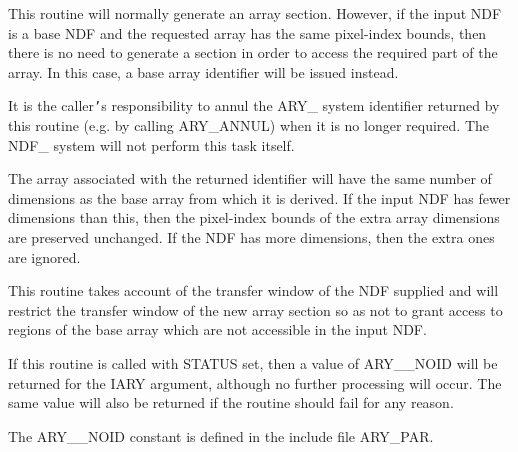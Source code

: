 \documentclass[twoside,11pt,nolof]{starlink}
\providecommand{\hi}[1]{{\texttt{#1}}}
\begin{document}
{{{         \sstitem
         This routine will normally generate an array section. However,
         if the input NDF is a base NDF and the requested array has the
         same pixel-index bounds, then there is no need to generate a
         section in order to access the required part of the array. In
         this case, a base array identifier will be issued instead.

         \sstitem
         It is the caller\hi{'}s responsibility to annul the ARY\_ system
         identifier returned by this routine (e.g. by calling ARY\_ANNUL)
         when it is no longer required. The NDF\_ system will not perform
         this task itself.

         \sstitem
         The array associated with the returned identifier will have
         the same number of dimensions as the base array from which it is
         derived. If the input NDF has fewer dimensions than this, then
         the pixel-index bounds of the extra array dimensions are
         preserved unchanged. If the NDF has more dimensions, then the
         extra ones are ignored.

         \sstitem
         This routine takes account of the transfer window of the NDF
         supplied and will restrict the transfer window of the new array
         section so as not to grant access to regions of the base array
         which are not accessible in the input NDF.

         \sstitem
         If this routine is called with STATUS set, then a value of
         ARY\_\_NOID will be returned for the IARY argument, although no
         further processing will occur. The same value will also be
         returned if the routine should fail for any reason.

         \sstitem
         The ARY\_\_NOID constant is defined in the include file ARY\_PAR.
      }
   }
}
\end{document}
